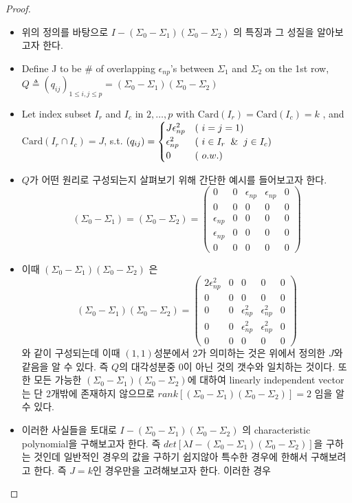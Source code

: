 \begin{proof}
\begin{itemize}
\begin{itemize}
    \item 위의 정의를 바탕으로 $I-(\Sigma_0 -\Sigma_1)(\Sigma_0 -\Sigma_2)$ 의 특징과 그 성질을 알아보고자 한다.
    \vspace{5mm}
    \item Define J to be # of overlapping $\epsilon_{np}$'s between $\Sigma_1$ and $\Sigma_2$ on the 1st row, $Q \triangleq (q_{ij})_{1\leq{i,j}\leq{p}} = (\Sigma_0 -\Sigma_1)(\Sigma_0 -\Sigma_2)$
    \vspace{5mm}
    \item Let index subset $I_r$ and $I_c$ in ${2,\ldots,p}$ with $\text{Card}(I_r)=\text{Card}(I_c)=k$ , and  $\text{Card}(I_r\cap{I_c})=J$, s.t. $(q_{ij})=\begin{cases} J{\epsilon^2_{np}} & (~i=j=1) \\ {\epsilon^2_{np}} & (~i\in I_r \And j\in I_c) \\ 0 & (~o.w.) \end{cases}$
    \vspace{5mm}
    \item $Q$가 어떤 원리로 구성되는지 살펴보기 위해 간단한 예시를 들어보고자 한다.
     $$(\Sigma_0 -\Sigma_1)=(\Sigma_0 -\Sigma_2)=
     \begin{pmatrix} 
0 & 0 & \epsilon_{np} & \epsilon_{np} & 0\\
0 & 0 & 0 & 0 & 0\\
\epsilon_{np} & 0 & 0 & 0 & 0\\
\epsilon_{np} & 0 & 0 & 0 & 0\\
0 & 0 & 0 & 0 & 0
\end{pmatrix}$$
    \item 이때 $(\Sigma_0 -\Sigma_1)(\Sigma_0 -\Sigma_2)$ 은
    $$(\Sigma_0 -\Sigma_1)(\Sigma_0 -\Sigma_2)=
         \begin{pmatrix} 
2{\epsilon^2_{np}} & 0 & 0 & 0 & 0\\
0 & 0 & 0 & 0 & 0\\
0 & 0 & {\epsilon^2_{np}} & {\epsilon^2_{np}} & 0\\
0 & 0 & {\epsilon^2_{np}} & {\epsilon^2_{np}} & 0\\
0 & 0 & 0 & 0 & 0
\end{pmatrix}$$
와 같이 구성되는데 이때 $(1,1)$성분에서 $2$가 의미하는 것은 위에서 정의한 $J$와 같음을 알 수 있다. 즉 $Q$의 대각성분중 0이 아닌 것의
갯수와 일치하는 것이다. 또한 모든 가능한 $(\Sigma_0 -\Sigma_1)(\Sigma_0 -\Sigma_2)$에 대하여 linearly independent vector는 단 2개밖에
존재하지 않으므로 $rank[(\Sigma_0 -\Sigma_1)(\Sigma_0 -\Sigma_2)]=2$ 임을 알 수 있다.
    \vspace{5mm}
       \item 이러한 사실들을 토대로 $I-(\Sigma_0 -\Sigma_1)(\Sigma_0 -\Sigma_2)$ 의 characteristic polynomial을 구해보고자 한다. 즉
    $det[\lambda{I}-(\Sigma_0 -\Sigma_1)(\Sigma_0 -\Sigma_2)]$을 구하는 것인데 일반적인 경우의 값을 구하기 쉽지않아 특수한 경우에 한해서
    구해보려고 한다. 즉 $J=k$인 경우만을 고려해보고자 한다. 이러한 경우
    

\end{itemize}
\end{itemize}
\end{proof}
